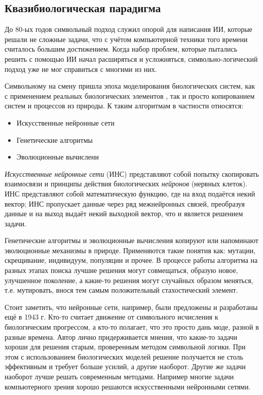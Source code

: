 \documentclass[12pt]{report}
\newenvironment{myItemize}{
	\begin{itemize}
  		\setlength{\itemsep}{1pt}
  		\setlength{\parskip}{0pt}
  		\setlength{\parsep}{0pt}
}{\end{itemize}}
\begin{document}
\subsection{Квазибиологическая парадигма}
До 80-ых годов символьный подход служил опорой для написания ИИ, которые решали не сложные задачи, что с учётом компьютерной техники того времени считалось большим достижением. Когда набор проблем, которые пытались решить с помощью ИИ начал расширяться и усложняться, символьно-логический подход уже не мог справиться с многими из них.

Символьному на смену пришла эпоха моделирования биологических систем, как с применением реальных биологических элементов \citep{rambidi2002}, так и просто копированием систем и процессов из природы. К таким алгоритмам в частности относятся:

\begin{samepage}

\begin{myItemize}
\item Искусственные нейронные сети
\item Генетические алгоритмы
\item Эволюционные вычислени
\end{myItemize}
\end{samepage}
\emph{Искусственные нейронные сети} (ИНС) представляют собой попытку скопировать взаимосвязи и принципы действия биологических \emph{нейронов} (нервных клеток). ИНС представляют собой математическую функцию, где на вход подаётся некий вектор; ИНС пропускает данные через ряд межнейронных связей, преобразуя данные и на выход выдаёт некий выходной вектор, что и является решением задачи.\cite{haykin1994neural}

Генетические алгоритмы и эволюционные вычисления копируют или напоминают эволюционные механизмы в природе. Применяются такие понятия как: мутации, скрещивание, индивидуум, популяции и прочее. В процессе работы алгоритма на разных этапах поиска лучшие решения могут совмещаться, образую новое, улучшенное поколение, а какие-то решения могут случайных образом меняться, т.е. мутировать, внося тем самым положительный стахостический элемент.\citep{russell1995}

Стоит заметить, что нейронные сети, например, были предложены и разработаны ещё в 1943 г. \citep{mcculloch1943} Кто-то считает движение от символьного исчисления к биологическим прогрессом, а кто-то полагает, что это просто дань моде, разной в разные времена. \citep{millington2009} Автор лично придерживается мнения, что какие-то задачи хороши для решения старым, проверенным методом символьной логики. При этом с использованием биологических моделей решение получается не столь эффективным и требует больше усилий, а другие наоборот. Другие же задачи наоборот лучше решать современным методами. Например многие задачи компьютерного зрения хорошо решаются искусственными нейронными сетями. \citep{haykin1994neural}
\end{document}
